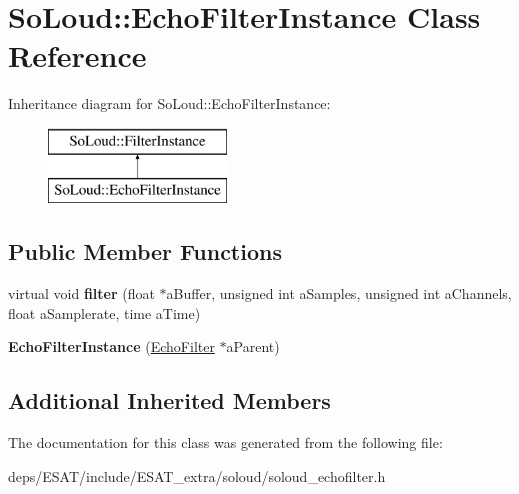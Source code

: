 \hypertarget{class_so_loud_1_1_echo_filter_instance}{}\section{So\+Loud\+:\+:Echo\+Filter\+Instance Class Reference}
\label{class_so_loud_1_1_echo_filter_instance}
Inheritance diagram for So\+Loud\+:\+:Echo\+Filter\+Instance\+:\begin{figure}[H]
\begin{center}
\leavevmode
\includegraphics[height=2.000000cm]{class_so_loud_1_1_echo_filter_instance}
\end{center}
\end{figure}
\subsection*{Public Member Functions}
\begin{DoxyCompactItemize}
\item 
\mbox{\label{class_so_loud_1_1_echo_filter_instance_a70347a6f9b0ec23b06ebf6da94b63259}} 
virtual void {\bfseries filter} (float $\ast$a\+Buffer, unsigned int a\+Samples, unsigned int a\+Channels, float a\+Samplerate, time a\+Time)
\item 
\mbox{\label{class_so_loud_1_1_echo_filter_instance_ab2584f4cbaa08c31555538a7a557ee70}} 
{\bfseries Echo\+Filter\+Instance} (\mbox{\hyperlink{class_so_loud_1_1_echo_filter}{Echo\+Filter}} $\ast$a\+Parent)
\end{DoxyCompactItemize}
\subsection*{Additional Inherited Members}


The documentation for this class was generated from the following file\+:\begin{DoxyCompactItemize}
\item 
deps/\+E\+S\+A\+T/include/\+E\+S\+A\+T\+\_\+extra/soloud/soloud\+\_\+echofilter.\+h\end{DoxyCompactItemize}
